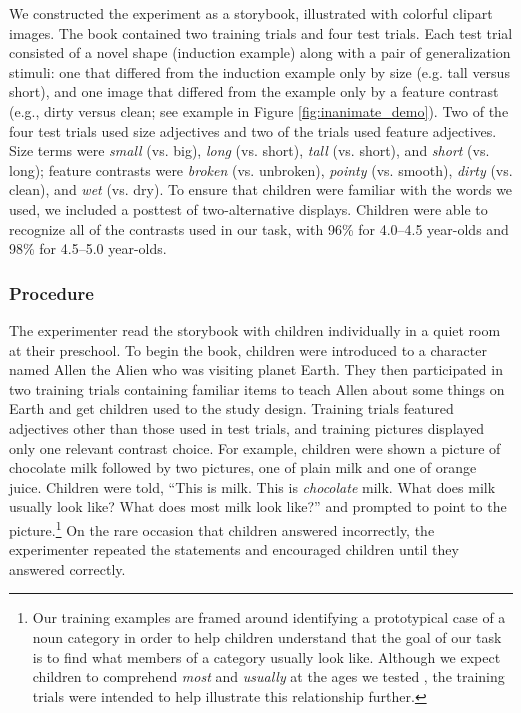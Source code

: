 \documentclass[man]{apa2}
\begin{document}
We constructed the experiment as a storybook, illustrated with colorful clipart images. The book contained two training trials and four test trials. Each test trial consisted of a novel shape (induction example) along with a pair of generalization stimuli: one that differed from the induction example only by size (e.g. tall versus short), and one image that differed from the example only by a feature contrast (e.g., dirty versus clean; see example in Figure \ref{fig:inanimate_demo}). Two of the four test trials used size adjectives and two of the trials used feature adjectives. Size terms were \emph{small} (vs. big), \emph{long} (vs. short), \emph{tall} (vs. short), and \emph{short} (vs. long);  feature contrasts were \emph{broken} (vs. unbroken), \emph{pointy} (vs. smooth), \emph{dirty} (vs. clean), and \emph{wet} (vs. dry).  To ensure that children were familiar with the words we used, we included a posttest of two-alternative displays.  Children were able to recognize all of the contrasts used in our task, with 96\% for 4.0--4.5 year-olds and 98\% for 4.5--5.0 year-olds.  





\subsubsection{Procedure}



The experimenter read the storybook with children individually in a quiet room at their preschool. To begin the book, children were introduced to a character named Allen the Alien who was visiting planet Earth.  They then participated in two training trials containing familiar items to teach Allen about some things on Earth and get children used to the study design.  Training trials featured adjectives other than those used in test trials, and training pictures displayed only one relevant contrast choice.  For example, children were shown a picture of chocolate milk followed by two pictures, one of plain milk and one of orange juice. Children were told, ``This is milk. This is \emph{chocolate} milk.  What does milk usually look like?  What does most milk look like?'' and prompted to point to the picture.\footnote{Our training examples are framed around identifying a prototypical case of a noun category in order to help children understand that the goal of our task is to find what members of a category usually look like. Although we expect children to comprehend \emph{most} and \emph{usually} at the ages we tested \cite{halberda2008}, the training trials were intended to  help illustrate this relationship further.}
On the rare occasion that children answered incorrectly, the experimenter repeated the statements and encouraged children until they answered correctly.  
\end{document}

